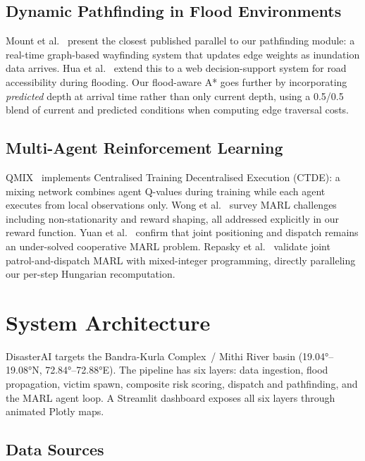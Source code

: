 \documentclass[conference]{IEEEtran}
\begin{document}
\subsection{Dynamic Pathfinding in Flood Environments}

Mount et al.~\cite{mount2019wayfinding} present the closest published parallel
to our pathfinding module: a real-time graph-based wayfinding system that
updates edge weights as inundation data arrives.
Hua et al.~\cite{hua2022decision} extend this to a web decision-support system
for road accessibility during flooding.
Our flood-aware A* goes further by incorporating \emph{predicted} depth at
arrival time rather than only current depth, using a 0.5/0.5 blend
of current and predicted conditions when computing edge traversal costs.

\subsection{Multi-Agent Reinforcement Learning}

QMIX~\cite{rashid2018qmix} implements Centralised Training Decentralised
Execution (CTDE): a mixing network combines agent Q-values during training
while each agent executes from local observations only.
Wong et al.~\cite{wong2023deep} survey MARL challenges including
non-stationarity and reward shaping, all addressed explicitly in our
reward function.
Yuan et al.~\cite{yuan2023cooperative} confirm that joint positioning and
dispatch remains an under-solved cooperative MARL problem.
Repasky et al.~\cite{repasky2024police} validate joint patrol-and-dispatch
MARL with mixed-integer programming, directly paralleling our per-step
Hungarian recomputation.

\section{System Architecture}
\label{sec:arch}

DisasterAI targets the Bandra-Kurla Complex~/ Mithi River basin
(19.04°--19.08°N, 72.84°--72.88°E).
The pipeline has six layers: data ingestion, flood propagation, victim spawn,
composite risk scoring, dispatch and pathfinding, and the MARL agent loop.
A Streamlit dashboard exposes all six layers through animated Plotly maps.

\subsection{Data Sources}
\end{document}
